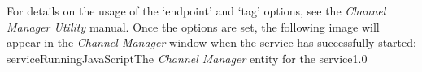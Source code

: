For details on the usage of the `endpoint' and `tag' options, see the \emph{Channel
Manager Utility} manual.
Once the options are set, the following image will appear in the \emph{Channel Manager}
window when the service has successfully started:
%
{serviceRunningJavaScript}{The \emph{Channel Manager} entity for the \JSIO{} service}{1.0}
\secondaryEnd
\primaryEnd{}
